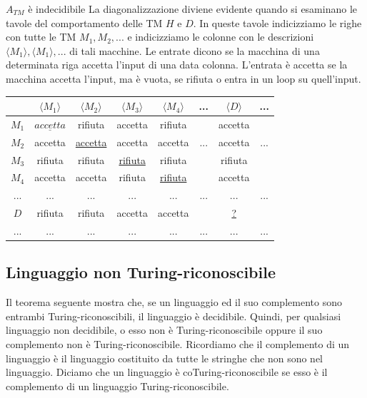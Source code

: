 \begin{Thm}{$A_{TM}$ è indecidibile}{}
La diagonalizzazione diviene evidente quando si esaminano le tavole del comportamento delle TM $H$ e $D$. In queste tavole indicizziamo le righe con tutte le TM $M_{1}, M_{2},...$ e indicizziamo le colonne con le descrizioni $\langle M_{1}\rangle, \langle M_{1}\rangle, ...$ di tali macchine. Le entrate dicono se la macchina di una determinata riga accetta l'input di una data colonna. L'entrata è accetta se la macchina accetta l'input, ma è vuota, se rifiuta o entra in un loop su quell'input.
\begin{center}
\begin{tabular}{|c|c c c c c c c|}
     \hline
     & $\langle M_1\rangle$ & $\langle M_2\rangle$ & $\langle M_3\rangle$ & $\langle M_4\rangle$ & ... & $\langle D\rangle$ & ...\\\hline
     $M_1$ & $\underline{accetta}$ & rifiuta & accetta & rifiuta& & accetta &\\
     $M_2$ & accetta & \underline{accetta} & accetta & accetta& ... & accetta & ...\\
     $M_3$ & rifiuta & rifiuta & \underline{rifiuta} & rifiuta& & rifiuta & \\
     $M_4$ & accetta & accetta & rifiuta &  \underline{rifiuta}& & accetta & \\
     ... & ... & ... & ... & ... & ... & ... & ...\\
     $D$ & rifiuta & rifiuta & accetta & accetta& & \underline{?} & \\
     ... & ... & ... & ... & ... & ... & ... & ...\\\hline
\end{tabular}
\end{center}
\end{Thm}

\subsection{Linguaggio non Turing-riconoscibile}
Il teorema seguente mostra che, se un linguaggio ed il suo complemento sono entrambi Turing-riconoscibili, il linguaggio è decidibile. Quindi, per qualsiasi linguaggio non decidibile, o esso non è Turing-riconoscibile oppure il suo complemento non è Turing-riconoscibile. Ricordiamo che il complemento di un linguaggio è il linguaggio costituito da tutte le stringhe che non sono nel linguaggio. Diciamo che un linguaggio è coTuring-riconoscibile se esso è il complemento di un linguaggio Turing-riconoscibile.


